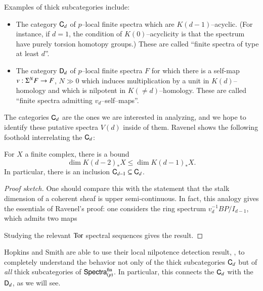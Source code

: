 \noindent Examples of thick subcategories include:
\begin{itemize}
\item The category $\mathsf{C}_d$ of $p$--local finite spectra which are $K(d-1)$--acyclic.  (For instance, if $d = 1$, the condition of $K(0)$--acyclicity is that the spectrum have purely torsion homotopy groups.)  These are called ``finite spectra of type at least $d$''.
\item The category $\mathsf{D}_d$ of $p$--local finite spectra $F$ for which there is a self-map $v: \Sigma^N F \to F$, $N \gg 0$ which induces multiplication by a unit in $K(d)$--homology and which is nilpotent in $K(\ne d)$--homology.  These are called ``finite spectra admitting $v_d$--self--maps''.
\end{itemize}

\noindent The categories $\mathsf{C}_d$ are the ones we are interested in analyzing, and we hope to identify these putative spectra $V(d)$ inside of them.  Ravenel shows the following foothold interrelating the $\mathsf{C}_d$:

\begin{lemma}\label{CdCategoriesNest}
For $X$ a finite complex, there is a bound \[\dim K(d-2)_* X \le \dim K(d-1)_* X.\]  In particular, there is an inclusion $\mathsf{C}_{d-1} \subseteq \mathsf{C}_d$.
\end{lemma}
\begin{proof}[Proof sketch]
One should compare this with the statement that the stalk dimension of a coherent sheaf is upper semi-continuous.  In fact, this analogy gives the essentials of Ravenel's proof: one considers the ring spectrum $v_d^{-1} BP / I_{d-1}$, which admits two maps
\begin{center}
\end{center}
Studying the relevant $\operatorname{Tor}$ spectral sequences gives the result.
\end{proof}

Hopkins and Smith are able to use their local nilpotence detection result, , to completely understand the behavior not only of the thick subcategories $\mathsf{C}_d$ but of \emph{all} thick subcategories of $\mathsf{Spectra}_{(p)}^{\mathrm{fin}}$.  In particular, this connects the $\mathsf{C}_d$ with the $\mathsf{D}_d$, as we will see.

